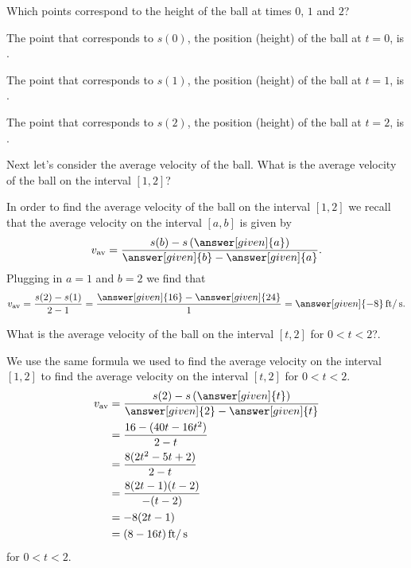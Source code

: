 \documentclass{ximera}
\begin{document}
\begin{example}
\begin{image}
\end{image}

Which points correspond to the height of the ball at times $0$, $1$ and $2$? 
\begin{explanation}
The point that corresponds to $s(0)$, the position (height) of the 
ball at $t=0$, is .

The point that corresponds to $s(1)$, the position (height) of the 
ball at $t=1$, is .

The point that corresponds to $s(2)$, the position (height) of the 
ball at $t=2$, is .

\end{explanation}

Next let's consider the average velocity of the ball. What is the average velocity of the ball on the interval $[1,2]$?

\begin{explanation}

In order to find the average velocity of the ball on the 
interval $[1,2]$ we recall that the average velocity on 
the interval $[a,b]$ is given by
\[
v_{\text{av}} = 
\frac{s(b) - s\left(\answer[given]{a}\right)}
{\answer[given]{b} - \answer[given]{a}}.
\]
Plugging in $a=1$ and $b=2$ we find that 
\[
v_{\text{av}} = \frac{s(2)-s(1)}{2-1} = 
\frac{\answer[given]{16} - \answer[given]{24}}{1} =
\answer[given]{-8}\unit{ft}/\unit{s}.
\] 

\end{explanation}

What is the average velocity of the ball on the interval
$[t,2]$ for $0<t<2$?.  

\begin{explanation}

We use the same formula we used to find the average velocity on
the interval $[1,2]$ to find the average velocity on the interval
$[t,2]$ for $0<t<2$.
\begin{align*}
v_{\text{av}} &= 
\frac{s(2)-s\left(\answer[given]{t}\right)}
{\answer[given]{2}-\answer[given]{t}}\\
&= \frac{16 - (40t-16t^2)}{2-t}\\
&= \frac{8(2t^2-5t+2)}{2-t}\\
&= \frac{8(2t-1)(t-2)}{-(t-2)}\\
&= -8(2t-1)\\
&= (8-16t)\unit{ft}/\unit{s}
\end{align*}
for $0<t<2$.


\end{explanation}
\end{example}
\end{document}
